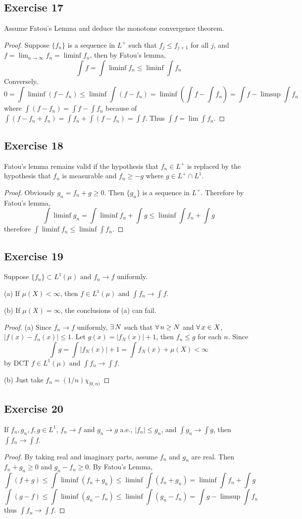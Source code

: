 \subsection*{Exercise 17}
Assume Fatou's Lemma and deduce the monotone convergence theorem.
\begin{proof}
    Suppose $\{f_n\}$ is a sequence in $L^+$ such that $f_j\le f_{j+1}$ for all $j$, and $f=\lim_{n\to\infty}f_n=\liminf f_n$, then by Fatou's lemma,
    $$
    \int f=\int\liminf f_n\le\liminf\int f_n
    $$
    Conversely,
    $$
    0=\int\liminf(f- f_n)\le\liminf\int (f-f_n)=\liminf(\int f-\int f_n)=\int f-\limsup\int f_n
    $$
    where $\int (f-f_n)=\int f-\int f_n$ because of $\int(f-f_n+f_n)=\int f_n+\int (f-f_n)=\int f$. Thus $\int f=\lim\int f_n$.
\end{proof}
\subsection*{Exercise 18}
Fatou's lemma remains valid if the hypothesis that $f_n\in L^+$ is replaced by the hypothesis that $f_n$ is measurable and $f_n\ge -g$ where $g\in L^+\cap L^1$.
\begin{proof}
    Obviously $g_n=f_n+g\ge 0$. Then $\{g_n\}$ is a sequence in $L^+$. Therefore by Fatou's lemma,
    $$
    \int\liminf g_n=\int\liminf f_n+\int g\le\liminf\int f_n+\int g
    $$
    therefore $\int\liminf f_n\le\liminf\int f_n$.
\end{proof}
\subsection*{Exercise 19}
Suppose $\{f_n\}\subset L^1(\mu)$ and $f_n\to f$ uniformly.
\par (a) If $\mu(X)<\infty$, then $f\in L^1(\mu)$ and $\int f_n\to\int f$.
\par (b) If $\mu(X)=\infty$, the conclusions of (a) can fail.
\begin{proof}
    (a) Since $f_n\to f$ uniformly, $\exists\, N$ such that $\forall\, n\ge N$ and $\forall\, x\in X$, $|f(x)-f_n(x)|\le1$. Let $g(x)=|f_N(x)|+1$, then $f_n\le g$ for each $n$. Since
    $$
    \int g=\int|f_N(x)|+1=\int f_N(x)+\mu(X)<\infty
    $$
    by DCT $f\in L^1(\mu)$ and $\int f_n\to\int f$.
    \par (b) Just take $f_n=(1/n)\chi_{[0,n)}$
\end{proof}
\subsection*{Exercise 20}
If $f_n,g_n,f,g\in L^1$, $f_n\to f$ and $g_n\to g$ a.e., $|f_n|\le g_n$, and $\int g_n\to\int g$, then $\int f_n\to\int f$.
\begin{proof}
    By taking real and imaginary parts, assume $f_n$ and $g_n$ are real. Then $f_n+g_n\ge 0$ and $g_n-f_n\ge 0$. By Fatou's Lemma,
    $$
    \int(f+g)\le\int\liminf (f_n+g_n)\le\liminf\int(f_n+g_n)=\liminf\int f_n+\int g
    $$
    $$
    \int(g-f)\le\int\liminf (g_n-f_n)\le\liminf\int(g_n-f_n)=\int g-\limsup\int f_n
    $$
    thus $\int f_n\to\int f$.
\end{proof}
